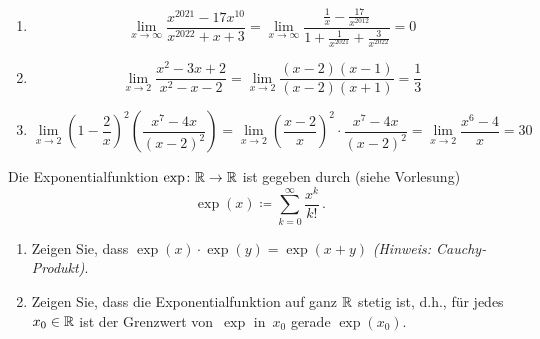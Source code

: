 \bigskip

\begin{lsg}
\begin{enumerate}[label=$\mathrm{(\roman*)}$, ref=$\mathrm{\roman*}$]
\setlength{\itemsep}{4pt}
\item\[\lim_{x \to\infty}\frac{x^{2021}-17x^{10}}{x^{2022}+x+3} =\lim_{x \to\infty} \frac{\frac{1}{x}-\frac{17}{x^{2012}}}{1+\frac{1}{x^{2021}}+\frac{3}{x^{2022}}}=0 \]		
\item\[\lim_{x \to 2}\frac{x^{2}-3x+2}{x^{2}-x-2}= \lim_{x \to 2} \frac{(x-2)(x-1)}{(x-2)(x+1)}=\frac{1}{3}\]
\item\[ \lim_{x \to 2}\left(1-\frac{2}{x}\right)^2\left(\frac{x^7-4x}{\left(x-2\right)^2}\right)=\lim_{x \to 2}\left(\frac{x-2}{x}\right)^2    \cdot \frac{x^7-4x}{(x-2)^2}=\lim_{x \to 2} \frac{x^6-4}{x}= 30\] 
\end{enumerate}
\end{lsg}

\bigskip

\begin{aufg}[6 Punkte]
Die Exponentialfunktion $\exp\colon\mathbb{R}\to\mathbb{R}$ ist gegeben durch (siehe Vorlesung)
\[
\exp(x)\coloneqq \sum_{k=0}^{\infty}\frac{x^k}{k!}\,. 
\]
\begin{enumerate}[label=$\mathrm{(\roman*)}$, ref=$\mathrm{\roman*}$]
\item Zeigen Sie, dass $\exp(x)\cdot \exp(y)=\exp(x+y)$ \emph{(Hinweis: Cauchy-Produkt)}.
\item Zeigen Sie, dass die Exponentialfunktion auf ganz $\mathbb{R}$ stetig ist, d.h., f\"ur jedes~$x_0\in\mathbb{R}$ ist der Grenzwert von~$\exp$ in~$x_0$ gerade $\exp(x_0)$.
\end{enumerate}
\end{aufg}
 
\bigskip

